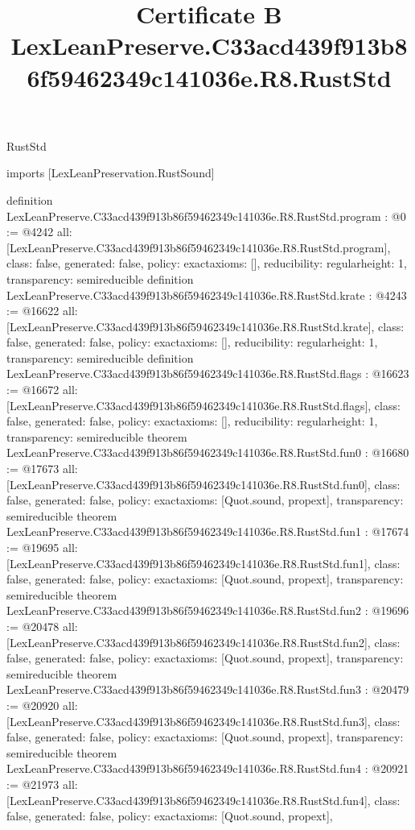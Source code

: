 \begin{lexlean}{RustStd}
\title{Certificate B LexLeanPreserve.C33acd439f913b86f59462349c141036e.R8.RustStd}
\begin{coremodule}
imports [LexLeanPreservation.RustSound]

definition LexLeanPreserve.C33acd439f913b86f59462349c141036e.R8.RustStd.program : @0 := @4242 {
  all: [LexLeanPreserve.C33acd439f913b86f59462349c141036e.R8.RustStd.program],
  class: false,
  generated: false,
  policy: exact{axioms: []},
  reducibility: regular{height: 1},
  transparency: semireducible
}
definition LexLeanPreserve.C33acd439f913b86f59462349c141036e.R8.RustStd.krate : @4243 := @16622 {
  all: [LexLeanPreserve.C33acd439f913b86f59462349c141036e.R8.RustStd.krate],
  class: false,
  generated: false,
  policy: exact{axioms: []},
  reducibility: regular{height: 1},
  transparency: semireducible
}
definition LexLeanPreserve.C33acd439f913b86f59462349c141036e.R8.RustStd.flags : @16623 := @16672 {
  all: [LexLeanPreserve.C33acd439f913b86f59462349c141036e.R8.RustStd.flags],
  class: false,
  generated: false,
  policy: exact{axioms: []},
  reducibility: regular{height: 1},
  transparency: semireducible
}
theorem LexLeanPreserve.C33acd439f913b86f59462349c141036e.R8.RustStd.fun0 : @16680 := @17673 {
  all: [LexLeanPreserve.C33acd439f913b86f59462349c141036e.R8.RustStd.fun0],
  class: false,
  generated: false,
  policy: exact{axioms: [Quot.sound, propext]},
  transparency: semireducible
}
theorem LexLeanPreserve.C33acd439f913b86f59462349c141036e.R8.RustStd.fun1 : @17674 := @19695 {
  all: [LexLeanPreserve.C33acd439f913b86f59462349c141036e.R8.RustStd.fun1],
  class: false,
  generated: false,
  policy: exact{axioms: [Quot.sound, propext]},
  transparency: semireducible
}
theorem LexLeanPreserve.C33acd439f913b86f59462349c141036e.R8.RustStd.fun2 : @19696 := @20478 {
  all: [LexLeanPreserve.C33acd439f913b86f59462349c141036e.R8.RustStd.fun2],
  class: false,
  generated: false,
  policy: exact{axioms: [Quot.sound, propext]},
  transparency: semireducible
}
theorem LexLeanPreserve.C33acd439f913b86f59462349c141036e.R8.RustStd.fun3 : @20479 := @20920 {
  all: [LexLeanPreserve.C33acd439f913b86f59462349c141036e.R8.RustStd.fun3],
  class: false,
  generated: false,
  policy: exact{axioms: [Quot.sound, propext]},
  transparency: semireducible
}
theorem LexLeanPreserve.C33acd439f913b86f59462349c141036e.R8.RustStd.fun4 : @20921 := @21973 {
  all: [LexLeanPreserve.C33acd439f913b86f59462349c141036e.R8.RustStd.fun4],
  class: false,
  generated: false,
  policy: exact{axioms: [Quot.sound, propext]},
}
\end{coremodule}
\end{lexlean}
